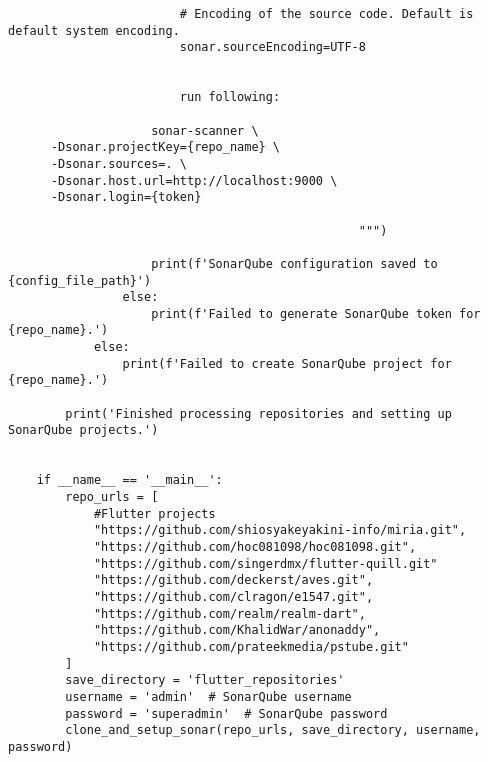 \begin{lstlisting}
                        # Encoding of the source code. Default is default system encoding.
                        sonar.sourceEncoding=UTF-8
                        
                        
                        run following:
                        
                    sonar-scanner \
      -Dsonar.projectKey={repo_name} \
      -Dsonar.sources=. \
      -Dsonar.host.url=http://localhost:9000 \
      -Dsonar.login={token}
                        
                                                 """)
    
                    print(f'SonarQube configuration saved to {config_file_path}')
                else:
                    print(f'Failed to generate SonarQube token for {repo_name}.')
            else:
                print(f'Failed to create SonarQube project for {repo_name}.')
    
        print('Finished processing repositories and setting up SonarQube projects.')
    
    
    if __name__ == '__main__':
        repo_urls = [
            #Flutter projects
            "https://github.com/shiosyakeyakini-info/miria.git",
            "https://github.com/hoc081098/hoc081098.git",
            "https://github.com/singerdmx/flutter-quill.git"
            "https://github.com/deckerst/aves.git",
            "https://github.com/clragon/e1547.git",
            "https://github.com/realm/realm-dart",
            "https://github.com/KhalidWar/anonaddy",
            "https://github.com/prateekmedia/pstube.git"
        ]
        save_directory = 'flutter_repositories'
        username = 'admin'  # SonarQube username
        password = 'superadmin'  # SonarQube password
        clone_and_setup_sonar(repo_urls, save_directory, username, password)
    
\end{lstlisting}